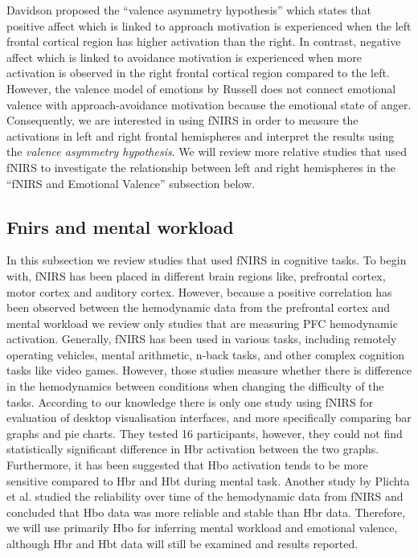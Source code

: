 \documentclass[a4paper]{report}
\begin{document}
		Davidson proposed the ``valence asymmetry hypothesis''\cite{davidson1992emotion} which states that positive affect which is linked to approach motivation is experienced when the left frontal cortical region has higher activation than the right. In contrast, negative affect which is linked to avoidance motivation is experienced when more activation is observed in the right frontal cortical region compared to the left. However, the valence model of emotions by Russell\cite{russell2003core} does not connect emotional valence with approach-avoidance motivation because the emotional state of anger. Consequently, we are interested in using fNIRS in order to measure the activations in left and right frontal hemispheres and interpret the results using the \textit{valence asymmetry hypothesis}. We will review more relative studies that used fNIRS to investigate the relationship between left and right hemispheres in the ``fNIRS and Emotional Valence'' subsection below. 
		
		\subsection{Fnirs and mental workload}
			In this subsection we review studies that used fNIRS in cognitive tasks. To begin with, fNIRS has been placed in different brain regions like, prefrontal cortex\cite{ayaz2012optical}, motor cortex\cite{hirth1996non} and auditory cortex\cite{plichta2011auditory}. However, because a positive correlation has been observed between the hemodynamic data from the prefrontal cortex and mental workload\cite{parasuraman2005neural} we review only studies that are measuring PFC hemodynamic activation. 
			Generally, fNIRS has been used in various tasks, including remotely operating vehicles\cite{durantin2014using,ayaz2012optical}, mental arithmetic\cite{pike2014measuring}, n-back tasks\cite{durantin2014using,ayaz2012optical}, and other complex cognition tasks like video games\cite{izzetoglu2004functional,bunce2011implementation,ayaz2012optical}. However, those studies measure whether there is difference in the hemodynamics between conditions when changing the difficulty of the tasks. According to our knowledge there is only one study using fNIRS for evaluation of desktop visualisation interfaces, and more specifically comparing bar graphs and pie charts\cite{peck2013using}. They tested 16 participants, however, they could not find statistically significant difference in Hbr activation between the two graphs.
			Furthermore, it has been suggested that Hbo activation tends to be more sensitive compared to Hbr and Hbt during  mental task\cite{naseer2014online}. Another study by Plichta et al.\cite{plichta2006event} studied the reliability over time of the hemodynamic data from fNIRS and concluded that Hbo data was more reliable and stable than Hbr data. Therefore, we will use primarily Hbo for inferring mental workload and emotional valence, although Hbr and Hbt data will still be examined and results reported.
			
\end{document}
